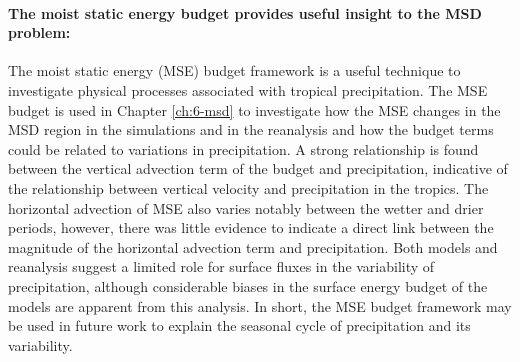 \paragraph{The moist static energy budget provides useful insight to the MSD problem:}
The moist static energy (MSE) budget framework is a useful technique to investigate physical processes associated with tropical precipitation. 
The MSE budget is used in Chapter \ref{ch:6-msd} to investigate how the MSE changes in the MSD region in the simulations and in the reanalysis and how the budget terms could be related to variations in precipitation. 
A strong relationship is found between the vertical advection term of the budget and precipitation, indicative of the relationship between vertical velocity and precipitation in the tropics. %
The horizontal advection of MSE also varies notably between the wetter and drier periods, however, there was little evidence to indicate a direct link between the magnitude of the horizontal advection term and precipitation. 
Both models and reanalysis suggest a limited role for surface fluxes in the variability of precipitation, although considerable biases in the surface energy budget of the models are apparent from this analysis. 
In short, the MSE budget framework may be used in future work to explain the seasonal cycle of precipitation and its variability.


